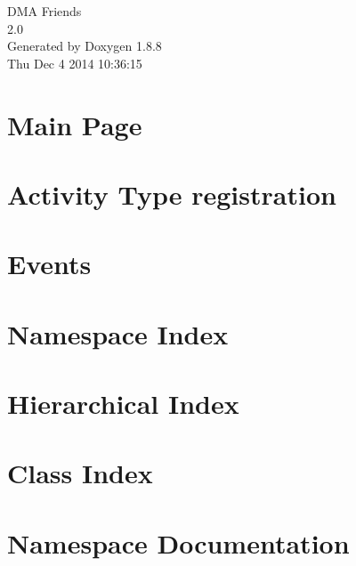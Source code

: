 \documentclass[twoside]{book}
\newcommand{\+}{\discretionary{\mbox{\scriptsize$\hookleftarrow$}}{}{}}
\newcommand{\clearemptydoublepage}{%
  \newpage{\pagestyle{empty}\cleardoublepage}%
}
\begin{document}
\hypersetup{pageanchor=false,
             bookmarks=true,
             bookmarksnumbered=true,
             pdfencoding=unicode
            }
\begin{titlepage}
\vspace*{7cm}
\begin{center}%
{\Large D\+M\+A Friends \\[1ex]\large 2.\+0 }\\
\vspace*{1cm}
{\large Generated by Doxygen 1.8.8}\\
\vspace*{0.5cm}
{\small Thu Dec 4 2014 10:36:15}\\
\end{center}
\end{titlepage}
\clearemptydoublepage
\tableofcontents
\clearemptydoublepage
{}
\hypersetup{pageanchor=true}

\chapter{Main Page}
\label{index}\hypertarget{index}{}
\chapter{Activity Type registration}
\label{df/d06/md_docs_ACTIVITY-TYPES}
\hypertarget{df/d06/md_docs_ACTIVITY-TYPES}{}

\chapter{Events}
\label{df/d0e/md_docs_EVENTS}
\hypertarget{df/d0e/md_docs_EVENTS}{}

\chapter{Namespace Index}

\chapter{Hierarchical Index}

\chapter{Class Index}

\chapter{Namespace Documentation}



\end{document}
